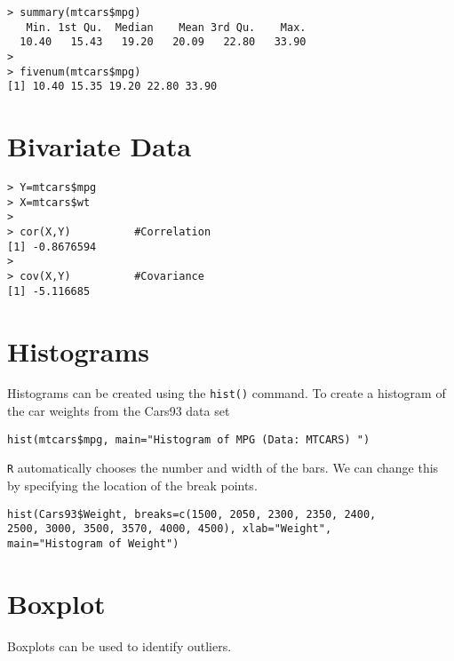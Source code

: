 \documentclass[a4paper,12pt]{article}
\begin{document}
\footnotesize
\begin{myindentpar}{1cm}
\begin{verbatim}
> summary(mtcars$mpg)
   Min. 1st Qu.  Median    Mean 3rd Qu.    Max.
  10.40   15.43   19.20   20.09   22.80   33.90 
>
> fivenum(mtcars$mpg)
[1] 10.40 15.35 19.20 22.80 33.90
\end{verbatim}
\end{myindentpar}
\normalsize




\section{Bivariate Data}
\footnotesize \begin{myindentpar}{1cm}
\begin{verbatim}
> Y=mtcars$mpg
> X=mtcars$wt
>
> cor(X,Y)          #Correlation
[1] -0.8676594
>
> cov(X,Y)          #Covariance
[1] -5.116685
\end{verbatim}
\end{myindentpar}\normalsize


\section{Histograms}
Histograms can be created using the \texttt{hist()} command.
To create a histogram of the car weights from the Cars93 data set
\footnotesize
\begin{myindentpar}{1cm}
\begin{verbatim}
hist(mtcars$mpg, main="Histogram of MPG (Data: MTCARS) ")
\end{verbatim}
\end{myindentpar}\normalsize
\texttt{R} automatically chooses the number and width of the bars. We can
change this by specifying the location of the break points.
\footnotesize
\begin{myindentpar}{1cm}
\begin{verbatim}hist(Cars93$Weight, breaks=c(1500, 2050, 2300, 2350, 2400,
2500, 3000, 3500, 3570, 4000, 4500), xlab="Weight",
main="Histogram of Weight")
\end{verbatim}
\end{myindentpar}\normalsize



\section{Boxplot}
Boxplots can be used to identify outliers.
\end{document}
